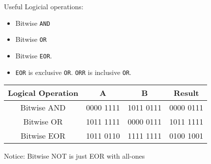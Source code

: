 \begin{frame}[fragile]


    


Useful Logicial operations: 
\begin{itemize}
    \item Bitwise \texttt{AND}
    \item Bitwise \texttt{OR}
    \item Bitwise \texttt{EOR}.
    \item \texttt{EOR} is exclusive \texttt{OR}. \texttt{ORR} is inclusive \texttt{OR}.
\end{itemize} 

 \begin{center}
    \begin{tabular}{c|cc|c}
      Logical Operation & A & B & Result\\
      \hline
      Bitwise AND & 0000 1111 & 1011 0111 & 0000 0111 \\
      Bitwise OR & 1011 1111 & 0000 0111 & 1011 1111 \\
      Bitwise EOR & 1011 0110 & 1111 1111 & 0100 1001 \\
      \end{tabular}
    \end{center}
Notice: Bitwise NOT is just EOR with all-ones


\end{frame}
